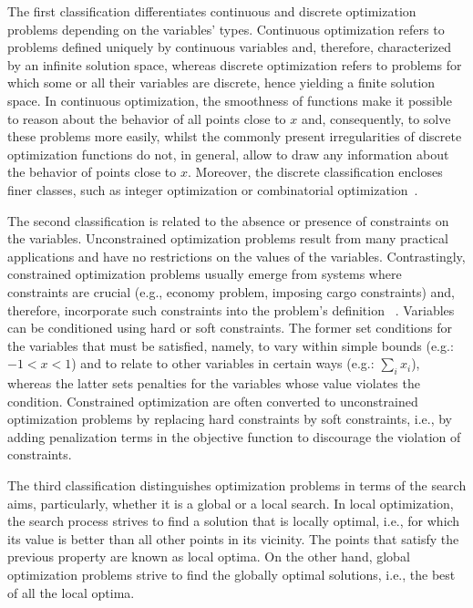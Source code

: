 	The first classification differentiates continuous and discrete optimization problems depending on the variables' types. Continuous optimization refers to problems defined uniquely by continuous variables and, therefore, characterized by an infinite solution space, whereas discrete optimization refers to problems for which some or all their variables are discrete, hence yielding a finite solution space. In continuous optimization, the smoothness of functions make it possible to reason about the behavior of all points close to $x$ and, consequently, to solve these problems more easily, whilst the commonly present irregularities of discrete optimization functions do not, in general, allow to draw any information about the behavior of points close to $x$. Moreover, the discrete classification encloses finer classes, such as integer optimization or combinatorial optimization~\cite{Nemhauser1988}. 
	
	The second classification is related to the absence or presence of constraints on the variables. Unconstrained optimization problems result from many practical applications and have no restrictions on the values of the variables. Contrastingly, constrained optimization problems usually emerge from systems where constraints are crucial (e.g., economy problem, imposing cargo constraints) and, therefore, incorporate such constraints into the problem's definition ~\cite{Nocedal2011NumericalOptimization}. Variables can be conditioned using hard or soft constraints. The former set conditions for the variables that must be satisfied, namely, to vary within simple bounds (e.g.: $-1<x<1$) and to relate to other variables in certain ways (e.g.: $\sum_{i} x_i$), whereas the latter sets penalties for the variables whose value violates the condition. Constrained optimization are often converted to unconstrained optimization problems by replacing hard constraints by soft constraints, i.e., by adding penalization terms in the objective function to discourage the violation of constraints. 
	
	The third classification distinguishes optimization problems in terms of the search aims, particularly, whether it is a global or a local search. In local optimization, the search process strives to find a solution that is locally optimal, i.e., for which its value is better than all other points in its vicinity. The points that satisfy the previous property are known as local optima. On the other hand, global optimization problems strive to find the globally optimal solutions, i.e., the best of all the local optima.

